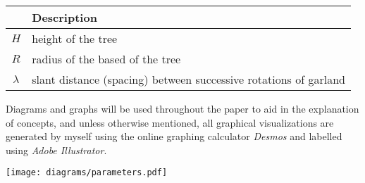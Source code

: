 \noindent
\begin{minipage}{0.65\textwidth}
    \setlength{\parindent}{17pt}
    \noindent
    \begin{table}[H]
        \centering
        \singlespacing
        \begin{tabularx}{0.95\textwidth}{>{\hsize=0.4\hsize}c>{\hsize=0.6\hsize}X}
            \toprule
            {\bfseries Parameter} & {\bfseries Description}                                          \\
            \midrule
            $H$                   & height of the tree                                               \\
            $R$                   & radius of the based of the tree                                  \\
            $\lambda$             & slant distance (spacing) between successive rotations of garland \\
            \bottomrule
        \end{tabularx}
    \end{table}

    Diagrams and graphs will be used throughout the paper to aid in the explanation of concepts, and unless otherwise mentioned, all graphical visualizations are generated by myself using the online graphing calculator \emph{Desmos} and labelled using \emph{Adobe Illustrator}.
\end{minipage}
\begin{minipage}{0.35\textwidth}
    \centering
    \texttt{[image: diagrams/parameters.pdf]}
     \label{fig:params}
\end{minipage}


